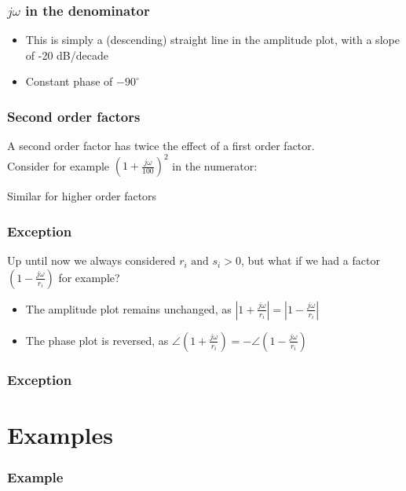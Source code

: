 \begin{frame}
\frametitle{$j\omega$ in the denominator}

\begin{itemize}
\item This is simply a (descending) straight line in the amplitude plot, with a slope of -20 dB/decade
\item Constant phase of $-90^{\circ}$
\end{itemize}



\end{frame}



\begin{frame}
\frametitle{Second order factors}
A second order factor has twice the effect of a first order factor.\\
Consider for example $(1+\frac{j\omega}{100})^2$ in the numerator:


Similar for higher order factors

\end{frame}


\begin{frame}
\frametitle{Exception}
Up until now we always considered $r_i \text{ and } s_i > 0$, but what if we had a factor $(1-\frac{j\omega}{r_i})$ for example?
\begin{itemize}
\item The amplitude plot remains unchanged, as $|1+\frac{j\omega}{r_i}| = |1 - \frac{j\omega}{r_i} |$
\item The phase plot is reversed, as $\angle(1+\frac{j\omega}{r_i}) = -\angle(1 - \frac{j\omega}{r_i})$
\end{itemize}



\end{frame}


\begin{frame}
\frametitle{Exception}


\end{frame}

\section{Examples}

\begin{frame}
\frametitle{Example}

\end{frame}

